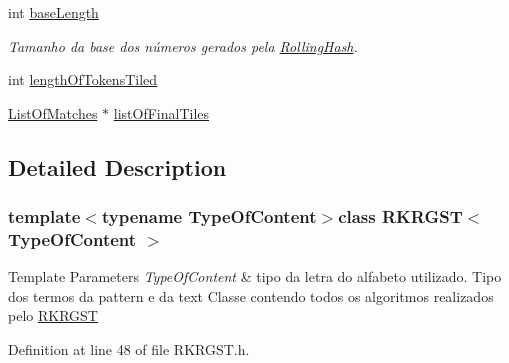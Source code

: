 \begin{DoxyCompactItemize}
int \hyperlink{classRKRGST_a49054fd9d1f1fc34a5c2dedaba5e6f14}{base\+Length}
\begin{DoxyCompactList}\small\item\em Tamanho da base dos números gerados pela \hyperlink{classRollingHash}{Rolling\+Hash}. \end{DoxyCompactList}\item 
int \hyperlink{classRKRGST_aaebf5b2da8490b6fc1ea06300914256e}{length\+Of\+Tokens\+Tiled}
\item 
\hyperlink{classListOfMatches}{List\+Of\+Matches} $\ast$ \hyperlink{classRKRGST_a1ae736b742c0cbcdd6d30c5201d4181b}{list\+Of\+Final\+Tiles}
\end{DoxyCompactItemize}


\subsection{Detailed Description}
\subsubsection*{template$<$typename Type\+Of\+Content$>$class R\+K\+R\+G\+S\+T$<$ Type\+Of\+Content $>$}


\begin{DoxyTemplParams}{Template Parameters}
{\em Type\+Of\+Content} & tipo da letra do alfabeto utilizado. Tipo dos termos da pattern e da text Classe contendo todos os algoritmos realizados pelo \hyperlink{classRKRGST}{R\+K\+R\+G\+S\+T} \\
\hline
\end{DoxyTemplParams}


Definition at line 48 of file R\+K\+R\+G\+S\+T.\+h.



